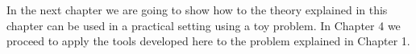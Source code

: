 \documentclass[12pt]{book}
\begin{document}
In the next chapter we are going to show how to the theory explained in  this chapter
can be used in a practical setting using a toy problem. In Chapter 4 we 
proceed to apply the tools developed here to the problem explained in Chapter 1.


%
%
%
%
%
% 
%
\end{document}

